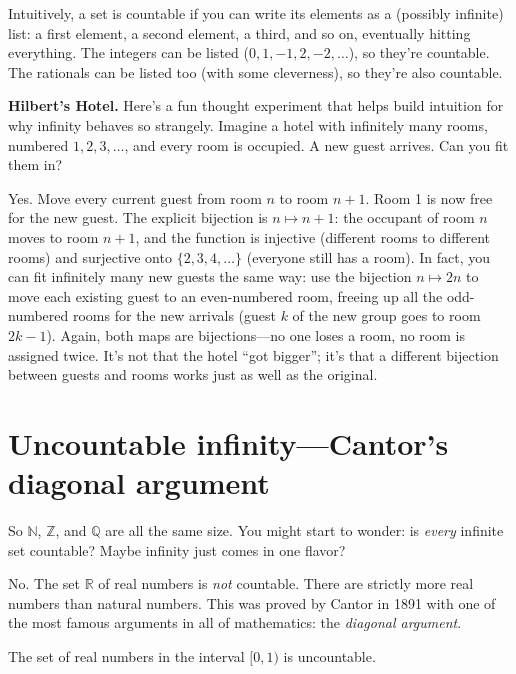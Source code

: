 \documentclass[11pt]{article}
\begin{document}
Intuitively, a set is countable if you can write its elements as a (possibly infinite) list: a first element, a second element, a third, and so on, eventually hitting everything. The integers can be listed ($0, 1, -1, 2, -2, \ldots$), so they're countable. The rationals can be listed too (with some cleverness), so they're also countable.

\medskip
\noindent\textbf{Hilbert's Hotel.} Here's a fun thought experiment that helps build intuition for why infinity behaves so strangely. Imagine a hotel with infinitely many rooms, numbered $1, 2, 3, \ldots$, and every room is occupied. A new guest arrives. Can you fit them in?

Yes. Move every current guest from room $n$ to room $n+1$. Room 1 is now free for the new guest. The explicit bijection is $n \mapsto n+1$: the occupant of room $n$ moves to room $n+1$, and the function is injective (different rooms to different rooms) and surjective onto $\{2, 3, 4, \ldots\}$ (everyone still has a room). In fact, you can fit infinitely many new guests the same way: use the bijection $n \mapsto 2n$ to move each existing guest to an even-numbered room, freeing up all the odd-numbered rooms for the new arrivals (guest $k$ of the new group goes to room $2k - 1$). Again, both maps are bijections---no one loses a room, no room is assigned twice. It's not that the hotel ``got bigger''; it's that a different bijection between guests and rooms works just as well as the original.

\section{Uncountable infinity---Cantor's diagonal argument}

So $\mathbb{N}$, $\mathbb{Z}$, and $\mathbb{Q}$ are all the same size. You might start to wonder: is \emph{every} infinite set countable? Maybe infinity just comes in one flavor?

No. The set $\mathbb{R}$ of real numbers is \emph{not} countable. There are strictly more real numbers than natural numbers. This was proved by Cantor in 1891 with one of the most famous arguments in all of mathematics: the \emph{diagonal argument}.

\begin{theorem}[Cantor]
The set of real numbers in the interval $[0, 1)$ is uncountable.
\end{theorem}
\end{document}
